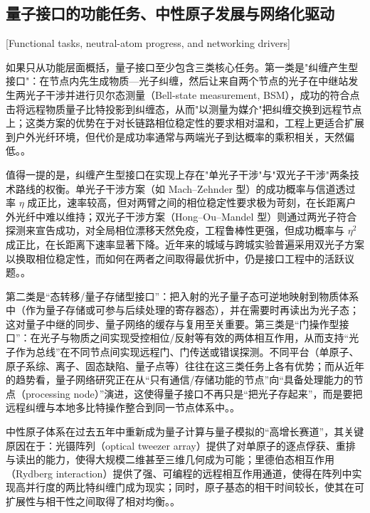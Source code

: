 \subsection{量子接口的功能任务、中性原子发展与网络化驱动}[Functional tasks, neutral-atom progress, and networking drivers]

如果只从功能层面概括，量子接口至少包含三类核心任务。第一类是"纠缠产生型接口"：在节点内先生成物质—光子纠缠，然后让来自两个节点的光子在中继站发生两光子干涉并进行贝尔态测量（Bell-state measurement, BSM），成功的符合点击将远程物质量子比特投影到纠缠态，从而"以测量为媒介"把纠缠交换到远程节点上；这类方案的优势在于对长链路相位稳定性的要求相对温和，工程上更适合扩展到户外光纤环境，但代价是成功率通常与两端光子到达概率的乘积相关，天然偏低。\cite{Zhu2025RemoteQuantumNetworksQuantumMemories,vanleent2022entangling}。%

值得一提的是，纠缠产生型接口在实现上存在"单光子干涉"与"双光子干涉"两条技术路线的权衡。单光子干涉方案（如 Mach–Zehnder 型）的成功概率与信道透过率 $\eta$ 成正比，速率较高，但对两臂之间的相位稳定性要求极为苛刻，在长距离户外光纤中难以维持；双光子干涉方案（Hong–Ou–Mandel 型）则通过两光子符合探测来宣告成功，对全局相位漂移天然免疫，工程鲁棒性更强，但成功概率与 $\eta^2$ 成正比，在长距离下速率显著下降。近年来的城域与跨城实验普遍采用双光子方案以换取相位稳定性，而如何在两者之间取得最优折中，仍是接口工程中的活跃议题。\cite{Zhu2025RemoteQuantumNetworksQuantumMemories}。%

第二类是“态转移/量子存储型接口”：把入射的光子量子态可逆地映射到物质体系中（作为量子存储或可参与后续处理的寄存器态），并在需要时再读出为光子态；这对量子中继的同步、量子网络的缓存与复用至关重要。第三类是“门操作型接口”：在光子与物质之间实现受控相位/反射等有效的两体相互作用，从而支持“光子作为总线”在不同节点间实现远程门、门传送或错误探测。不同平台（单原子、原子系综、离子、固态缺陷、量子点等）往往在这三类任务上各有优势；而从近年的趋势看，量子网络研究正在从“只有通信/存储功能的节点”向“具备处理能力的节点（processing node）”演进，这使得量子接口不再只是“把光子存起来”，而是要把远程纠缠与本地多比特操作整合到同一节点体系中。\cite{Covey2023QuantumNetworksNeutralAtomNodes,Reiserer2022CavityEnhancedNetworkNodes}。%

中性原子体系在过去五年中重新成为量子计算与量子模拟的“高增长赛道”，其关键原因在于：光镊阵列（optical tweezer array）提供了对单原子的逐点俘获、重排与读出的能力，使得大规模二维甚至三维几何成为可能；里德伯态相互作用（Rydberg interaction）提供了强、可编程的远程相互作用通道，使得在阵列中实现高并行度的两比特纠缠门成为现实；同时，原子基态的相干时间较长，使其在可扩展性与相干性之间取得了相对均衡。\cite{KaufmanNi2021OpticalTweezerArraysNatPhys}。%

